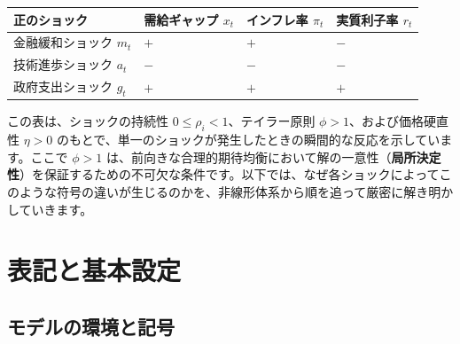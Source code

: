 \documentclass[
  japanese,
  lualatex,
  ja=standard,
  12pt,
  a4paper]{ltjsarticle}
\newcounter{none} %
\begin{document}
{\def\LTcaptype{none} %
\begin{longtable}[]{@{}
  >{\raggedright\arraybackslash}p{}
  >{\raggedleft\arraybackslash}p{}
  >{\raggedleft\arraybackslash}p{}
  >{\raggedleft\arraybackslash}p{}@{}}
\toprule\noalign{}
\begin{minipage}[b]{\linewidth}\raggedright
正のショック
\end{minipage} & \begin{minipage}[b]{\linewidth}\raggedleft
需給ギャップ \(x_t\)
\end{minipage} & \begin{minipage}[b]{\linewidth}\raggedleft
インフレ率 \(\pi_t\)
\end{minipage} & \begin{minipage}[b]{\linewidth}\raggedleft
実質利子率 \(r_t\)
\end{minipage} \\
\midrule\noalign{}
\endhead
\bottomrule\noalign{}
\endlastfoot
金融緩和ショック \(m_t\) & \(+\) & \(+\) & \(-\) \\
技術進歩ショック \(a_t\) & \(-\) & \(-\) & \(-\) \\
政府支出ショック \(g_t\) & \(+\) & \(+\) & \(+\) \\
\end{longtable}
}

この表は、ショックの持続性 \(0\leq\rho_i<1\)、テイラー原則
\(\phi>1\)、および価格硬直性 \(\eta>0\)
のもとで、単一のショックが発生したときの瞬間的な反応を示しています。ここで
\(\phi>1\)
は、前向きな合理的期待均衡において解の一意性（\textbf{局所決定性}）を保証するための不可欠な条件です。以下では、なぜ各ショックによってこのような符号の違いが生じるのかを、非線形体系から順を追って厳密に解き明かしていきます。

\Needspace{0.58\textheight}

\section{表記と基本設定}\label{ux8868ux8a18ux3068ux57faux672cux8a2dux5b9a}

\subsection{モデルの環境と記号}\label{ux30e2ux30c7ux30ebux306eux74b0ux5883ux3068ux8a18ux53f7}
\end{document}
